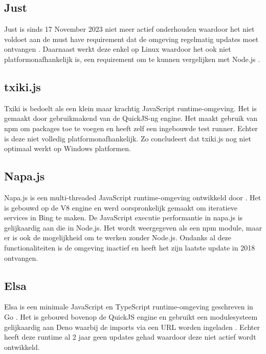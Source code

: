 \subsection{Just}
Just is sinds 17 November 2023 niet meer actief onderhouden waardoor het niet voldoet aan de must 
have requirement dat de omgeving regelmatig updates moet ontvangen \autocite{Johnston2023}.
Daarnaast werkt deze enkel op Linux waardoor het ook niet platformonafhankelijk is, 
een requirement om te kunnen vergelijken met Node.js \autocite{Johnston2023}.

\subsection{txiki.js}
Txiki is bedoelt als een klein maar krachtig JavaScript runtime-omgeving. 
Het is gemaakt door \textcite{Corretge2024} gebruikmakend van de QuickJS-ng engine. 
Het maakt gebruik van npm om packages toe te voegen en heeft zelf een ingebouwde test runner. 
Echter is deze niet volledig platformonafhankelijk. 
Zo concludeert \textcite{Corretge2024} dat txiki.js nog niet optimaal werkt op Windows platformen.

\subsection{Napa.js}
Napa.js is een multi-threaded JavaScript runtime-omgeving ontwikkeld door \textcite{Microsoft2018}. 
Het is gebouwd op de V8 engine en werd oorspronkelijk gemaakt om iteratieve services in Bing te maken.
De JavaScript executie performantie in napa.js is gelijkaardig aan die in Node.js. 
Het wordt weergegeven als een npm module, maar er is ook de mogelijkheid om te werken zonder Node.js.
Ondanks al deze functionaliteiten is de omgeving inactief en heeft het zijn laatste update in 2018 ontvangen.

\subsection{Elsa}
Elsa is een minimale JavaScript en TypeScript runtime-omgeving geschreven in Go \autocite{Garcia2022}. 
Het is gebouwd bovenop de QuickJS engine en gebruikt een modulesysteem gelijkaardig aan Deno waarbij de imports via een URL worden ingeladen \autocite{Garcia2022}.
Echter heeft deze runtime al 2 jaar geen updates gehad waardoor deze niet actief wordt ontwikkeld.

